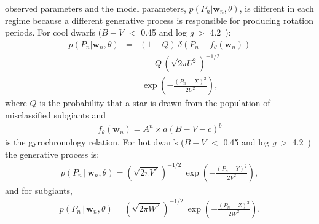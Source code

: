 \documentclass[useAMS, usenatbib]{mn2e}
\newcommand{\logg}{log \emph{g}}
\newcommand{\w}{\mathbf{w}}
\newcommand{\subcut}{4.2~}
\begin{document}
observed parameters and the model parameters, $p(P_n|\w_n, \theta)$, is
different in each regime because a different generative process is responsible
for producing rotation periods.
For cool dwarfs ($B-V$ $<$ 0.45 and \logg$~>$ \subcut):
\begin{eqnarray} \label{eq:codw}
p(P_n|\w_n,\theta) &=&
    (1-Q)~\delta \left (P_n - f_\theta(\w_n)\right) \\ \nonumber
    && +\quad Q\,\left(\sqrt{2\pi U^2}\right)^{-1/2} \\ \nonumber
    &&	~\exp\left({-\frac{(P_n-X)^2}{2U^2}}\right),
\end{eqnarray}
where $Q$ is the probability that a star is drawn from the population of
misclassified subgiants and
\begin{eqnarray}
f_\theta(\w_n) = A^n \times a(B-V - c)^b
\end{eqnarray}
is the gyrochronology relation.
For hot dwarfs ($B-V$ $<$ 0.45 and \logg$~>$ \subcut) the generative process
is:
\begin{eqnarray}
p(P_n\,|\,\w_n,\theta) = \left(\sqrt{2\pi V^2}\right)^{-1/2}~
\exp\left({-\frac{(P_n-Y)^2}{2V^2}}\right),
\end{eqnarray}
and for subgiants,
\begin{eqnarray}
p(P_n\,|\,\w_n,\theta) = \left(\sqrt{2\pi W^2}\right)^{-1/2}~
\exp\left({-\frac{(P_n-Z)^2}{2W^2}}\right).
\end{eqnarray}
\end{document}
